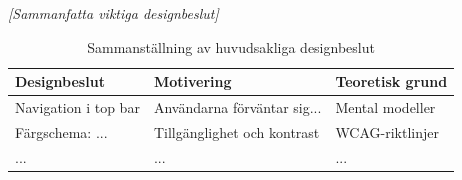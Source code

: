 \textit{[Sammanfatta viktiga designbeslut]}

\begin{table}[h]
\centering
\begin{tabular}{|p{4cm}|p{5cm}|p{4cm}|}
\hline
\textbf{Designbeslut} & \textbf{Motivering} & \textbf{Teoretisk grund} \\
\hline
Navigation i top bar & Användarna förväntar sig... & Mental modeller \cite{sharp2019} \\
\hline
Färgschema: ... & Tillgänglighet och kontrast & WCAG-riktlinjer \\
\hline
... & ... & ... \\
\hline
\end{tabular}
\caption{Sammanställning av huvudsakliga designbeslut}
\end{table}
